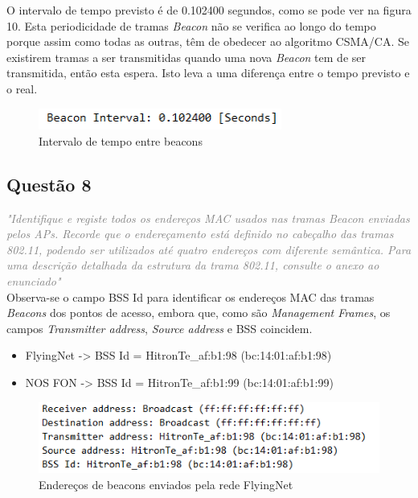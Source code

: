\documentclass{llncs}
\newcommand{\questionE}[1]{\textcolor{gray}{\textit{"#1"}}}
\begin{document}
O intervalo de tempo previsto é de 0.102400 segundos, como se pode ver na figura 10. Esta periodicidade de tramas \textit{Beacon} não se verifica ao longo do tempo porque assim como todas as outras, têm de obedecer ao algoritmo CSMA/CA. Se existirem tramas a ser transmitidas quando uma nova \textit{Beacon} tem de ser transmitida, então esta espera. Isto leva a uma diferença entre o tempo previsto e o real.

\begin{figure}[H]
\begin{center}
\includegraphics[width=8cm]{7.PNG}
\end{center}
\caption{Intervalo de tempo entre beacons}
\end{figure}

\subsection*{Questão 8}
\hspace{3mm} 
\questionE{Identifique e registe todos os endereços MAC usados nas tramas \textit{Beacon} enviadas pelos APs. Recorde que o endereçamento está definido no cabeçalho das tramas 802.11, podendo ser utilizados até quatro endereços com diferente semântica. Para uma descrição detalhada da estrutura da trama 802.11, consulte o anexo ao enunciado}\\ 

Observa-se o campo BSS Id para identificar os endereços MAC das tramas \textit{Beacons} dos pontos de acesso, embora que, como são \textit{Management Frames}, os campos \textit{Transmitter address}, \textit{Source address} e BSS coincidem.

\begin{itemize}
    \item FlyingNet -> BSS Id = HitronTe\_af:b1:98 (bc:14:01:af:b1:98)
    \item NOS FON -> BSS Id = HitronTe\_af:b1:99 (bc:14:01:af:b1:99)
\end{itemize}

\begin{figure}[H]
\begin{center}
\includegraphics[width=12cm]{8flyingnet.PNG}
\end{center}
\caption{Endereços de beacons enviados pela rede FlyingNet}
\end{figure}
\end{document}
